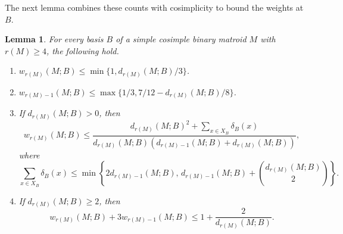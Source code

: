 \documentclass[10pt,a4paper]{article}
\numberwithin{equation}{section}
\newtheorem{lemma}[lemma]{Lemma}
\newcommand{\wloc}[1]{w_{#1}(M;B)}
\newcommand{\dloc}[1]{d_{#1}(M;B)}
\begin{document}
The next lemma combines these counts with cosimplicity
to bound the weights at \(B\).
\begin{lemma}\label{lem:local}
For every basis \(B\) of a simple cosimple binary matroid \(M\)
with \(r(M)\ge4\), the following hold.
\begin{enumerate}
\item[\(\mathrm{(i)}\)] \(\wloc{r(M)}\le\min\{1,\dloc{r(M)}/3\}\).
\item[\(\mathrm{(ii)}\)]\(\wloc{r(M)-1}\le\max\{1/3,7/12-\dloc{r(M)}/8\}\).
\item[\(\mathrm{(iii)}\)] If \(\dloc{r(M)}>0\), then
\[
 \wloc{r(M)}\le
 \frac{\dloc{r(M)}^2+\sum_{x\in X_B}\delta_B(x)}
 {\dloc{r(M)}(\dloc{r(M)-1}+\dloc{r(M)})},
\]
where
\[
 \sum_{x\in X_B}\delta_B(x)
 \le\min\left\{2\dloc{r(M)-1},\,
 \dloc{r(M)-1}+\binom{\dloc{r(M)}}2\right\}.
\]
\item[\(\mathrm{(iv)}\)] If \(\dloc{r(M)}\ge2\), then
\[
 \wloc{r(M)}+3\wloc{r(M)-1}
 \le1+\frac2{\dloc{r(M)}}.
\]
\end{enumerate}
\end{lemma}
\end{document}
